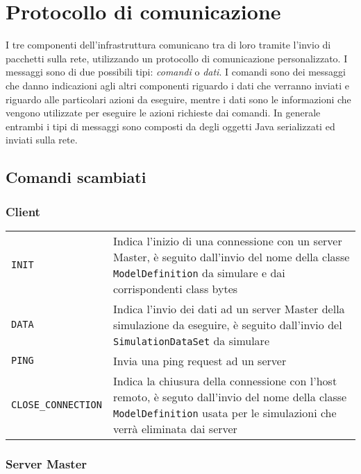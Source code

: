 
\section{Protocollo di comunicazione}

I tre componenti dell'infrastruttura comunicano tra di loro tramite l'invio di pacchetti sulla rete, utilizzando un protocollo di comunicazione personalizzato. 
I messaggi sono di due possibili tipi: \emph{comandi} o \emph{dati}. I comandi sono dei messaggi che danno indicazioni agli altri componenti riguardo i dati che verranno inviati e riguardo alle particolari azioni da eseguire, mentre i dati sono le informazioni che vengono utilizzate per eseguire le azioni richieste dai comandi. In generale entrambi i tipi di messaggi sono composti da degli oggetti Java serializzati ed inviati sulla rete.

\subsection{Comandi scambiati}

\subsubsection{Client}

\begin{table}[H]
    \begin{tabularx}{\linewidth}{ l X }
       \texttt{INIT}             & Indica l'inizio di una connessione con un server Master, è seguito dall'invio del nome della classe \texttt{ModelDefinition} da simulare e dai corrispondenti class bytes \\
       \texttt{DATA}             & Indica l'invio dei dati ad un server Master della simulazione da eseguire, è seguito dall'invio del \texttt{SimulationDataSet} da simulare \\
       \texttt{PING}             & Invia una ping request ad un server \\
       \texttt{CLOSE\_CONNECTION} & Indica la chiusura della connessione con l'host remoto, è seguto dall'invio del nome della classe \texttt{ModelDefinition} usata per le simulazioni che verrà eliminata dai server
    \end{tabularx}
\end{table}

\subsubsection{Server Master}

